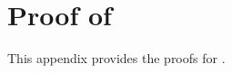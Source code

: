 \documentclass{article}
\theoremstyle{normaltheorem}
\newtheorem{example}[example]{Example}
\newcommand{\R}{\mathbb{R}}
\newcommand{\calS}{\mathcal{S}}
\begin{document}
\section{Proof of }\label{append_hyper_diff}
This appendix provides the proofs for .






\end{document}

